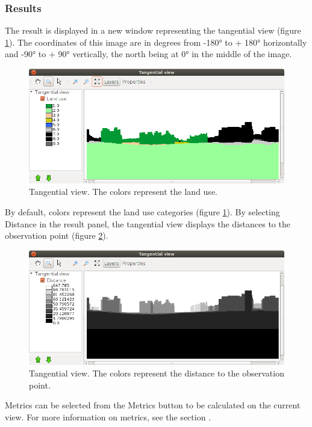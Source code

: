 \documentclass{report}
\begin{document}
\subsubsection{Results}
\label{viewtan_result}
The result is displayed in a new window representing the tangential view (figure \ref{viewtan_land}). The coordinates of this image are in degrees from -180° to + 180° horizontally and -90° to + 90° vertically, the north being at 0° in the middle of the image.

\begin{figure}[H]
	\includegraphics[scale=0.5]{img/viewtan_land-en.png} 
	\caption{Tangential view. The colors represent the land use.}
	\label{viewtan_land}
\end{figure}

By default, colors represent the land use categories (figure \ref{viewtan_land}). By selecting Distance in the result panel, the tangential view displays the distances to the observation point (figure \ref{viewtan_dist}).

\begin{figure}[H]
	\includegraphics[scale=0.5]{img/viewtan_dist-en.png} 
	\caption{Tangential view. The colors represent the distance to the observation point.}
	\label{viewtan_dist}
\end{figure}

Metrics can be selected from the Metrics button to be calculated on the current view. For more information on metrics, see the section .
\end{document}
